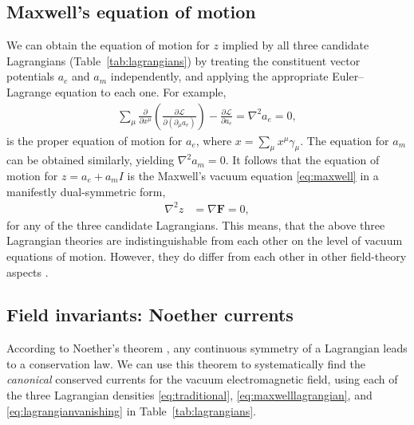 \documentclass[1p,sort&compress]{elsarticle}
\numberwithin{equation}{section}
\newcommand{\bv}[1]{\mathbf{#1}}
\begin{document}

\subsection{Maxwell's equation of motion}


We can obtain the equation of motion for $z$ implied by all three candidate Lagrangians (Table~\ref{tab:lagrangians}) by treating the constituent vector potentials $a_e$ and $a_m$ independently, and applying the appropriate Euler--Lagrange equation \cite{Doran2007, Soper1976} to each one.  For example,
\begin{align}\label{eq:eulerlagrange}
  \sum_\mu\frac{\partial}{\partial x^\mu}\left(\frac{\partial\mathcal{L}}{\partial(\partial_\mu a_e)}\right) - \frac{\partial \mathcal{L}}{\partial a_e} = \nabla^2 a_e = 0,
\end{align}
is the proper equation of motion for $a_e$, where $x = \sum_\mu x^\mu \gamma_\mu$.  The equation for $a_m$ can be obtained similarly, yielding $\nabla^2 a_m = 0$.  It follows that the equation of motion for $z = a_e + a_m I$ is the Maxwell's vacuum equation \eqref{eq:maxwell} in a manifestly dual-symmetric form,
\begin{align}\label{eq:maxwellvector}
  \nabla^2 z &= \nabla \bv{F} = 0,
\end{align}
for any of the three candidate Lagrangians. This means, that the above three Lagrangian theories are indistinguishable from each other on the level of vacuum equations of motion. However, they do differ from each other in other field-theory aspects \cite{Bliokh2013}.


\subsection{Field invariants: Noether currents}\label{sec:noether}


According to Noether's theorem \cite{Noether1918}, any continuous symmetry of a Lagrangian leads to a conservation law.  We can use this theorem to systematically find the \emph{canonical} conserved currents for the vacuum electromagnetic field, using each of the three Lagrangian densities \eqref{eq:traditional}, \eqref{eq:maxwelllagrangian}, and \eqref{eq:lagrangianvanishing} in Table~\ref{tab:lagrangians}.
\end{document}
